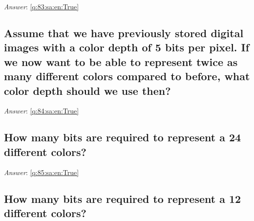 \documentclass[a4paper,11pt,oneside]{article}
\begin{document}
\begin{sloppypar}
\label{q:83:sa:en:False}

\vspace{2cm}

\noindent\makebox[\textwidth]{\hrulefill}

\vspace{1cm}

\textit{Answer}: \autoref{q:83:sa:en:True}



\subsection{Assume that we have previously stored digital images with a color depth of 5 bits per pixel. If we now want to be able to represent twice as many different colors compared to before, what color depth should we use then?}

\label{q:84:sa:en:False}

\vspace{2cm}

\noindent\makebox[\textwidth]{\hrulefill}

\vspace{1cm}

\textit{Answer}: \autoref{q:84:sa:en:True}



\subsection{How many bits are required to represent a 24 different colors?}

\label{q:85:sa:en:False}

\vspace{2cm}

\noindent\makebox[\textwidth]{\hrulefill}

\vspace{1cm}

\textit{Answer}: \autoref{q:85:sa:en:True}



\subsection{How many bits are required to represent a 12 different colors?}

\label{q:86:sa:en:False}

\vspace{2cm}

\noindent\makebox[\textwidth]{\hrulefill}


\end{sloppypar}
\end{document}
